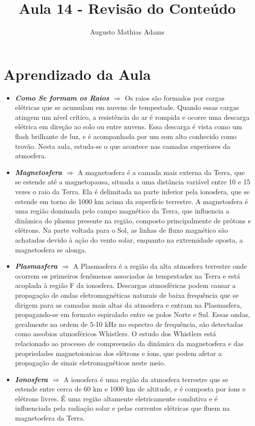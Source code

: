 \documentclass[a4paper, 12pt, onecolumn,singlespacing]{article}
\title{Aula 14 - Revisão do Conteúdo}
\author[1]{Augusto Mathias Adams}
\affil[1]{augusto.adams@ufpr.br}
\begin{document}
	
	\maketitle
	
	\section{Aprendizado da Aula}
	
	\begin{itemize}
		\item \textbf{\textit{Como Se formam os Raios $\Rightarrow$ }} Os raios são formados por cargas elétricas que se acumulam em nuvens de tempestade. Quando essas cargas atingem um nível crítico, a resistência do ar é rompida e ocorre uma descarga elétrica em direção ao solo ou entre nuvens. Essa descarga é vista como um flash brilhante de luz, e é acompanhada por um som alto conhecido como trovão. Nesta aula, estuda-se o que acontece nas camadas superiores da atmosfera.
		\item \textbf{\textit{Magnetosfera $\Rightarrow$ }}A magnetosfera é a camada mais externa da Terra, que se estende até a magnetopausa, situada a uma distância variável entre 10 e 15 vezes o raio da Terra. Ela é delimitada na parte inferior pela ionosfera, que se estende em torno de 1000 km acima da superfície terrestre. A magnetosfera é uma região dominada pelo campo magnético da Terra, que influencia a dinâmica do plasma presente na região, composto principalmente de prótons e elétrons. Na parte voltada para o Sol, as linhas de fluxo magnético são achatadas devido à ação do vento solar, enquanto na extremidade oposta, a magnetosfera se alonga.
		\item \textbf{\textit{Plasmasfera $\Rightarrow$ }} A Plasmasfera é a região da alta atmosfera terrestre onde ocorrem os primeiros fenômenos associados às tempestades na Terra e está acoplada à região F da ionosfera. Descargas atmosféricas podem causar a propagação de ondas eletromagnéticas naturais de baixa frequência que se dirigem para as camadas mais altas da atmosfera e entram na Plasmasfera, propagando-se em formato espiralado entre os polos Norte e Sul. Essas ondas, geralmente na ordem de 5-10 kHz no espectro de frequência, são detectadas como assobios atmosféricos Whistlers. O estudo dos Whistlers está relacionado ao processo de compreensão da dinâmica da magnetosfera e das propriedades magnetoionicas dos elétrons e íons, que podem afetar a propagação de sinais eletromagnéticos neste meio.
		\item \textbf{\textit{Ionosfera $\Rightarrow$ }}A ionosfera é uma região da atmosfera terrestre que se estende entre cerca de 60 km e 1000 km de altitude, e é composta por íons e elétrons livres. É uma região altamente eletricamente condutiva e é influenciada pela radiação solar e pelas correntes elétricas que fluem na magnetosfera da Terra.
		

\end{itemize}
\end{document}
